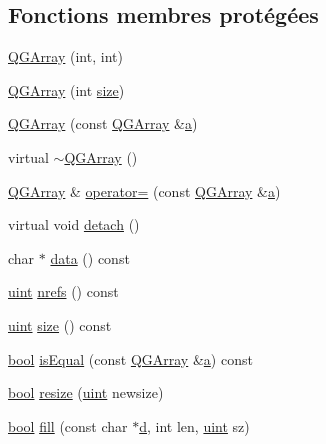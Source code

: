 \subsection*{Fonctions membres protégées}
\begin{DoxyCompactItemize}
\item 
\hyperlink{class_q_g_array_a2e7994baf52fce803843a886dc76e683}{Q\+G\+Array} (int, int)
\item 
\hyperlink{class_q_g_array_add5ddba43d2c6e80bd5465d2e14cfcee}{Q\+G\+Array} (int \hyperlink{class_q_g_array_a669525335ceeda8877e037e9438761ec}{size})
\item 
\hyperlink{class_q_g_array_acd319490fff3083fee3764d9b549717b}{Q\+G\+Array} (const \hyperlink{class_q_g_array}{Q\+G\+Array} \&\hyperlink{060__command__switch_8tcl_ab08ae027fc5777bc4f0629f1b60b35db}{a})
\item 
virtual \hyperlink{class_q_g_array_a0bf4daf83a5de6243718979f544a7707}{$\sim$\+Q\+G\+Array} ()
\item 
\hyperlink{class_q_g_array}{Q\+G\+Array} \& \hyperlink{class_q_g_array_a3714d63f6b4156772f0a0175337c66f7}{operator=} (const \hyperlink{class_q_g_array}{Q\+G\+Array} \&\hyperlink{060__command__switch_8tcl_ab08ae027fc5777bc4f0629f1b60b35db}{a})
\item 
virtual void \hyperlink{class_q_g_array_a538bae363739848c456c765a85caea6b}{detach} ()
\item 
char $\ast$ \hyperlink{class_q_g_array_a867d588cd6e0deb62206d9df58bbba5e}{data} () const 
\item 
\hyperlink{qglobal_8h_a4d3943ddea65db7163a58e6c7e8df95a}{uint} \hyperlink{class_q_g_array_a4d514437352428878340a96ce0d3aa72}{nrefs} () const 
\item 
\hyperlink{qglobal_8h_a4d3943ddea65db7163a58e6c7e8df95a}{uint} \hyperlink{class_q_g_array_a669525335ceeda8877e037e9438761ec}{size} () const 
\item 
\hyperlink{qglobal_8h_a1062901a7428fdd9c7f180f5e01ea056}{bool} \hyperlink{class_q_g_array_a034b774a5887e28e9f86a4307900f6a5}{is\+Equal} (const \hyperlink{class_q_g_array}{Q\+G\+Array} \&\hyperlink{060__command__switch_8tcl_ab08ae027fc5777bc4f0629f1b60b35db}{a}) const 
\item 
\hyperlink{qglobal_8h_a1062901a7428fdd9c7f180f5e01ea056}{bool} \hyperlink{class_q_g_array_ace6d58b8d81e8c9d0f99f9229263d6f5}{resize} (\hyperlink{qglobal_8h_a4d3943ddea65db7163a58e6c7e8df95a}{uint} newsize)
\item 
\hyperlink{qglobal_8h_a1062901a7428fdd9c7f180f5e01ea056}{bool} \hyperlink{class_q_g_array_a87c26192ed622a3f58a29f2c5dad455a}{fill} (const char $\ast$\hyperlink{060__command__switch_8tcl_af43f4b1f0064a33b2d662af9f06d3a00}{d}, int len, \hyperlink{qglobal_8h_a4d3943ddea65db7163a58e6c7e8df95a}{uint} sz)

\end{DoxyCompactItemize}

